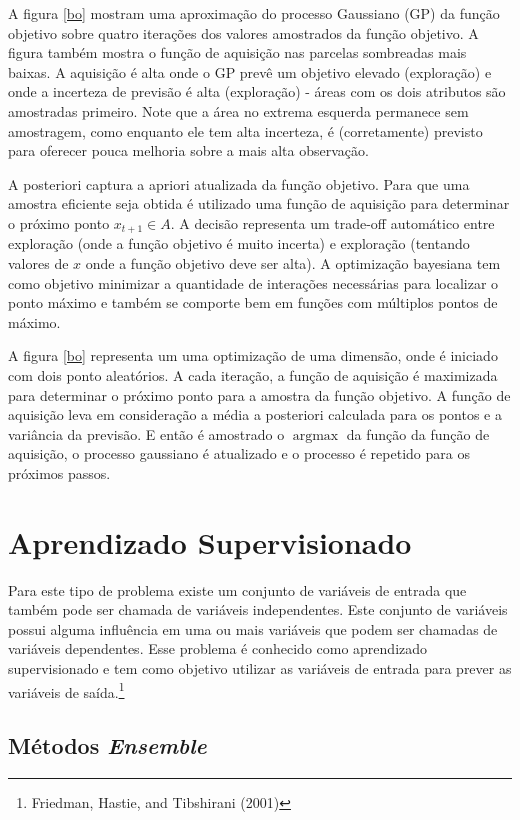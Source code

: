 \documentclass[
	12pt,				%
	a4paper,		%
	oneside,    %
	chapter=TITLE,		   %
	section=TITLE,		   %
	subsection=TITLE,	   %
	subsubsection=TITLE, %
	english,			%
	french,				%
	spanish,			%
	brazil,				%
]{abntex2}
\begin{document}
A figura \ref{bo} mostram uma aproximação do processo Gaussiano (GP) da
função objetivo sobre quatro iterações dos valores amostrados da função
objetivo. A figura também mostra o função de aquisição nas parcelas
sombreadas mais baixas. A aquisição é alta onde o GP prevê um objetivo
elevado (exploração) e onde a incerteza de previsão é alta (exploração)
- áreas com os dois atributos são amostradas primeiro. Note que a área
no extrema esquerda permanece sem amostragem, como enquanto ele tem alta
incerteza, é (corretamente) previsto para oferecer pouca melhoria sobre
a mais alta observação.

A posteriori captura a apriori atualizada da função objetivo. Para que
uma amostra eficiente seja obtida é utilizado uma função de aquisição
para determinar o próximo ponto \(x_{t+1} \in A\). A decisão representa
um trade-off automático entre exploração (onde a função objetivo é muito
incerta) e exploração (tentando valores de \(x\) onde a função objetivo
deve ser alta). A optimização bayesiana tem como objetivo minimizar a
quantidade de interações necessárias para localizar o ponto máximo e
também se comporte bem em funções com múltiplos pontos de máximo.

A figura \ref{bo} representa um uma optimização de uma dimensão, onde é
iniciado com dois ponto aleatórios. A cada iteração, a função de
aquisição é maximizada para determinar o próximo ponto para a amostra da
função objetivo. A função de aquisição leva em consideração a média a
posteriori calculada para os pontos e a variância da previsão. E então é
amostrado o \(\operatorname{argmax}\) da função da função de aquisição,
o processo gaussiano é atualizado e o processo é repetido para os
próximos passos.

\hypertarget{aprendizado-supervisionado}{%
\section{Aprendizado Supervisionado}\label{aprendizado-supervisionado}}

Para este tipo de problema existe um conjunto de variáveis de entrada
que também pode ser chamada de variáveis independentes. Este conjunto de
variáveis possui alguma influência em uma ou mais variáveis que podem
ser chamadas de variáveis dependentes. Esse problema é conhecido como
aprendizado supervisionado e tem como objetivo utilizar as variáveis de
entrada para prever as variáveis de saída.\footnote{Friedman, Hastie,
  and Tibshirani (2001)}

\hypertarget{muxe9todos-ensemble}{%
\subsection{\texorpdfstring{Métodos
\emph{Ensemble}}{Métodos Ensemble}}\label{muxe9todos-ensemble}}
\end{document}

